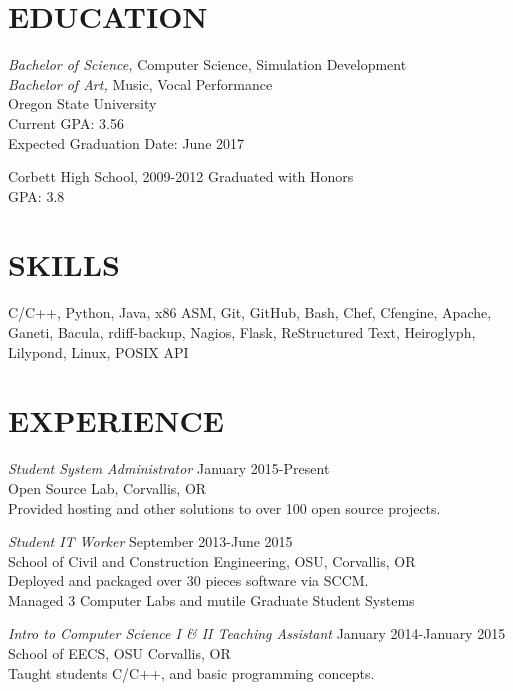 \documentclass[line,margin]{res}
\begin{document}
\address{(503)-758-6952, fahlmantaylor@gmail.com, tfahl.com}
\address{github.com/fahlmant, irc: recyclops or fahlmant on freenode}
\begin{resume}
 
\section{EDUCATION}
                    {\sl Bachelor of Science,} Computer Science, Simulation Development \\
                    {\sl Bachelor of Art,} Music, Vocal Performance \\
                    Oregon State University\\
                    Current GPA: 3.56\\
                    Expected Graduation Date: June 2017 
                    
                    Corbett High School, 2009-2012
                    Graduated with Honors\\
                    GPA: 3.8
\section{SKILLS}
                    C/C++, Python, Java, x86 ASM, Git, GitHub, Bash, Chef, Cfengine, Apache, Ganeti, Bacula, rdiff-backup,
                    Nagios, Flask, ReStructured Text, Heiroglyph, Lilypond, Linux, POSIX API
\section{EXPERIENCE}
                    {\sl Student System Administrator} \hfill January 2015-Present \\
                    Open Source Lab, 
                    Corvallis, OR\\
                    Provided hosting and other solutions to over 100 open source projects.

                    {\sl Student IT Worker} \hfill September 2013-June 2015 \\
                    School of Civil and Construction Engineering, OSU, 
                    Corvallis, OR\\ 
                    Deployed and packaged over 30 pieces software via SCCM.\\
                    Managed 3 Computer Labs and mutile Graduate Student Systems

                    {\sl Intro to Computer Science I \& II Teaching Assistant} \hfill January 2014-January 2015\\
                    School of EECS, OSU
                    Corvallis, OR\\
                    Taught students C/C++, and basic programming concepts.
                    

\end{resume}
\end{document}
